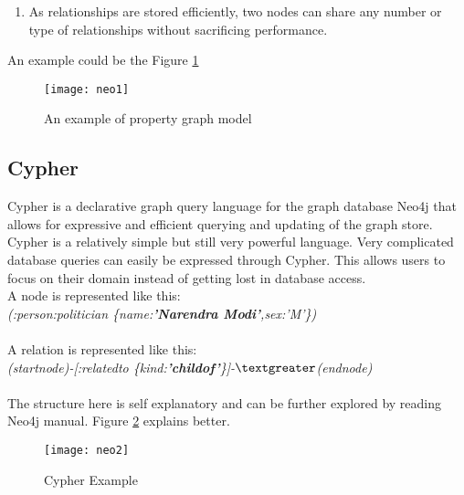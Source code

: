 \begin{enumerate}

\item As relationships are stored efficiently, two nodes can share any number or type of relationships without sacrificing performance.

\end{enumerate}

An example could be the Figure \ref{fig:neo1}

\begin{figure}[H]
\begin{center}  
\texttt{[image: neo1]} 
\caption{An example of property graph model}
\label{fig:neo1}
\end{center}
\end{figure}

\subsection{Cypher}

Cypher is a declarative graph query language for the graph database Neo4j that allows for expressive and efficient querying and updating of the graph store. Cypher is a relatively simple but still very powerful language. Very complicated database queries can easily be expressed through Cypher. This allows users to focus on their domain instead of getting lost in database access. \\

A node is represented like this: \\
    \emph{(:person:politician \{name:\textbf{'Narendra Modi'},sex:'M'\})}\\ \\
A relation is represented like this:\\
    \emph{(startnode)-[:relatedto \{kind:\textbf{'childof'}\}]-$\textgreater$(endnode)}\\ \\
The structure here is self explanatory and can be further explored by reading Neo4j manual. Figure \ref{fig:neo2} explains better.


\begin{figure}[H]
\begin{center}  
\texttt{[image: neo2]} 
\caption{Cypher Example}
\label{fig:neo2}
\end{center}
\end{figure}



